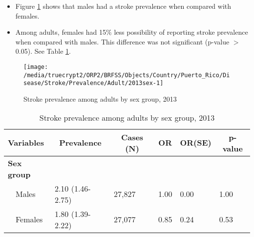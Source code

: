 \newpage
\begin{itemize}

\item Figure \ref{fig:sex.Stroke.2013} shows that males had a 
stroke prevalence when compared with females.


\item Among adults, females had 15\% less possibility of reporting stroke prevalence when compared with males. This difference was not significant (p-value $>$ 0.05). See Table \ref{tab:sex.Stroke.2013}.

\end{itemize}

\begin{figure}[H]
\caption{Stroke prevalence among adults by sex group, 
2013}
\begin{knitrout}
\color{fgcolor}

{\centering \texttt{[image: /media/truecrypt2/ORP2/BRFSS/Objects/Country/Puerto\_Rico/Disease/Stroke/Prevalence/Adult/2013sex-1]} 

}



\end{knitrout}
\label{fig:sex.Stroke.2013}
\end{figure}

\begin{table}[H]
\caption{Stroke prevalence  among adults by sex group, 2013\label{tab:sex.Stroke.2013}} 
\begin{center}
\begin{tabular}{llllll}
\hline\hline
\multicolumn{1}{l}{Variables}&\multicolumn{1}{c}{Prevalence}&\multicolumn{1}{c}{Cases (N)}&\multicolumn{1}{c}{OR}&\multicolumn{1}{c}{OR(SE)}&\multicolumn{1}{c}{p-value}\tabularnewline
\hline
{\bfseries Sex group}&&&&&\tabularnewline
~~Males&2.10 (1.46-2.75)&27,827&1.00&0.00&1.00\tabularnewline
~~Females&1.80 (1.39-2.22)&27,077&0.85&0.24&0.53\tabularnewline
\hline
\end{tabular}\end{center}

\end{table}


